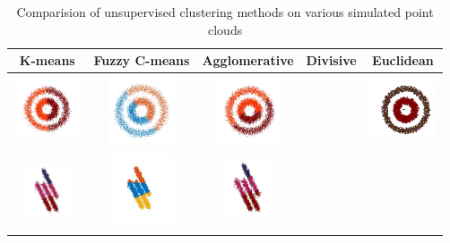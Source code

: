 \documentclass[12pt]{drexelthesis}
\begin{document}
 \begin{table}[h!]
     \centering
           \caption[Comparison of Unsupervised clustering methods]{\centering Comparision of unsupervised clustering methods on various simulated point clouds}
     \begin{tabular}{ | c | c | c | c | c | }
     \hline
      K-means & Fuzzy C-means & Agglomerative & Divisive & Euclidean \\ 
      \hline
      		\includegraphics[width=2cm]{2d-cluster-tests/k-means/concentric.jpg}
      & 
      		\includegraphics[trim={0 1cm 0 1cm},clip, width=2cm]{2d-cluster-tests/fcm/concentric.jpg}
      & 
      		\includegraphics[width=2cm]{2d-cluster-tests/agglomerative/concentric.jpg}
      &

      &
      		\includegraphics[width=2cm]{2d-cluster-tests/euclidean-distance/concentric.jpg}
      \\ \hline
      
            \includegraphics[width=1.5cm]{2d-cluster-tests/k-means/lines.jpg}
      & 
             \includegraphics[trim={0 1cm 0 0.5cm},clip,width=1.9cm]{2d-cluster-tests/fcm/lines.jpg}    
      & 
             \includegraphics[trim={0 1cm 0 0cm},clip,width=1.5cm]{2d-cluster-tests/agglomerative/lines.jpg}    
      &


\end{tabular}
\end{table}
\end{document}
